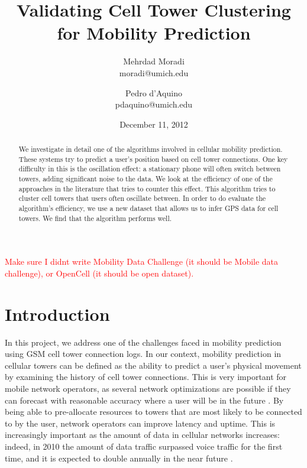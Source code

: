 \documentclass[letterpaper, 12pt, conference]{ieeeconf}
\newcommand{\xxx}[1]{\textcolor{red}{#1}}
\begin{document}
\title{\LARGE \bf
Validating Cell Tower Clustering for Mobility Prediction
}
\author{Mehrdad Moradi\\moradi@umich.edu \and Pedro d'Aquino\\
pdaquino@umich.edu}
\date{December 11, 2012}

\maketitle

\begin{abstract}
We investigate in detail one of the algorithms involved in cellular mobility 
prediction. These systems try to predict a user's position based on cell 
tower connections. One key difficulty in this is the oscillation effect: a 
stationary phone will often switch between towers, adding significant noise 
to the data. We look at the efficiency of one of the approaches in the 
literature that tries to counter this effect.  This algorithm tries to 
cluster cell towers that users often oscillate between. In order to do 
evaluate the algorithm's efficiency, we use a new dataset that allows us to 
infer GPS data for cell towers. We find that the algorithm performs well.
\end{abstract}
\xxx{Make sure I didnt write Mobility Data Challenge (it should be Mobile 
data challenge), or OpenCell (it should be open dataset).}

\section{Introduction}
\label{sec:intro}

In this project, we address one of the challenges faced in mobility 
prediction using GSM cell tower connection logs. In our context, mobility 
prediction in cellular
towers can be defined as the ability to predict a user's physical movement by 
examining the history of cell tower connections. This is very important
for mobile network operators, as several network optimizations are possible 
if they can forecast with reasonable accuracy
where a user will be in the future \cite{LeapGraph} \cite{Liu97anoptimal}. By 
being able to pre-allocate resources to towers that are most likely to
be connected to by the user, network operators can improve latency and 
uptime. This is increasingly important as the amount of data in cellular 
networks
increases: indeed, in 2010 the amount of data traffic surpassed voice traffic 
for the first time, and it is expected to double annually in the near future
\cite{EricssonData}.
\end{document}
